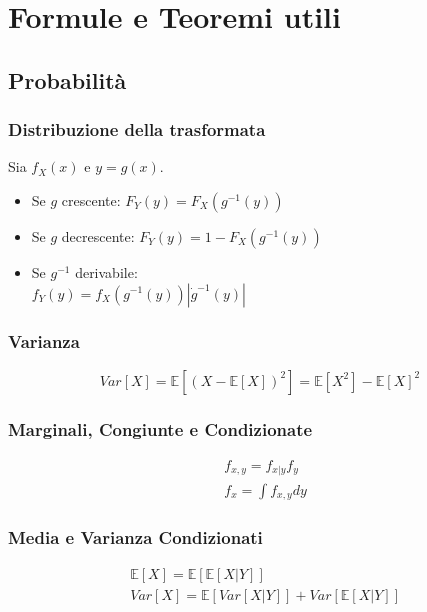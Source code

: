 \documentclass[a4paper,notitlepage]{report}%
\newcommand{\E}{\mathbb{E}} %
\begin{document}
\chapter*{Formule e Teoremi utili}

\begin{multicols*}{2}

\section*{Probabilità}


    \subsection*{Distribuzione della trasformata}
    Sia $f_X(x)$ e $y=g(x)$.
    \begin{itemize}
        \item Se $g$ crescente: $F_Y(y) = F_X(g^{-1}(y))$
        \item Se $g$ decrescente: $F_Y(y) = 1 - F_X(g^{-1}(y))$
        \item Se $g^{-1}$ derivabile: \\
            $f_Y(y) = f_X(g^{-1}(y)) |\dot{g}^{-1}(y)| $
    \end{itemize}


    \subsection*{Varianza}
    \[
        Var[X] = \E[(X-\E[X])^2] = \E[X^2]-\E[X]^2    
    \]


    \subsection*{Marginali, Congiunte e Condizionate}
    \begin{align*}
        & f_{x,y} = f_{x|y}f_y \\
        & f_x = \int f_{x,y} dy
    \end{align*}


    \subsection*{Media e Varianza Condizionati}
    \begin{align*}
        & \E[X] = \E[\E[X|Y]] \\
        & Var[X] = \E[Var[X|Y]] + Var[\E[X|Y]]
    \end{align*}



\end{multicols*}
\end{document}
